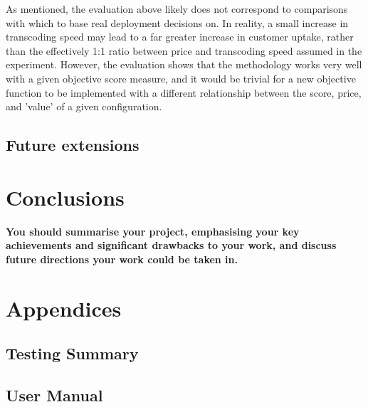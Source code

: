 \documentclass{article}
\begin{document}
As mentioned, the evaluation above likely does not correspond to comparisons with which to base real deployment decisions on. In reality, a small increase in transcoding speed may lead to a far greater increase in customer uptake, rather than the effectively 1:1 ratio between price and transcoding speed assumed in the experiment. However, the evaluation shows that the methodology works very well with a given objective score measure, and it would be trivial for a new objective function to be implemented with a different relationship between the score, price, and 'value' of a given configuration.
\subsection{Future extensions}
\section{Conclusions}
\textbf{You should summarise your project, emphasising your
key achievements and significant drawbacks to your
work, and discuss future directions your work could be
taken in.}
\newpage
\cite{Agarwal2012} %


\newpage
\section*{Appendices}
\subsection*{Testing Summary}
\subsection*{User Manual}
\end{document}
